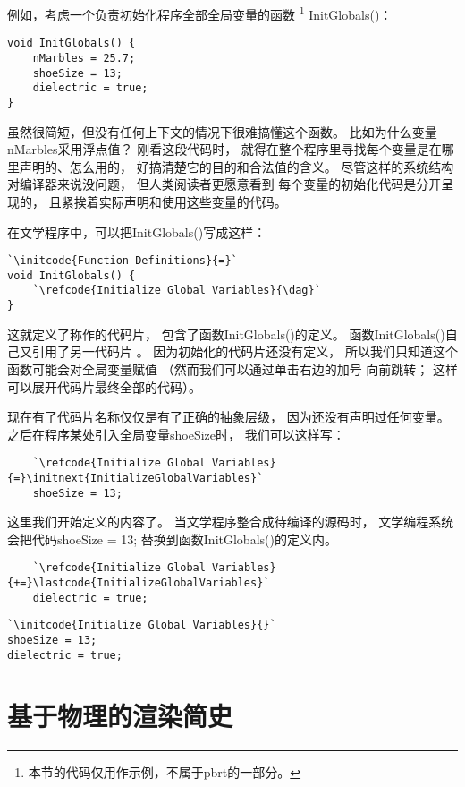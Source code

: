 例如，考虑一个负责初始化程序全部全局变量的函数
\footnote{本节的代码仅用作示例，不属于pbrt的一部分。}
{\ttfamily InitGlobals()}：
\begin{lstlisting}
void InitGlobals() {
    nMarbles = 25.7;
    shoeSize = 13;
    dielectric = true;
}
\end{lstlisting}

虽然很简短，但没有任何上下文的情况下很难搞懂这个函数。
比如为什么变量{\ttfamily nMarbles}采用浮点值？
刚看这段代码时，
就得在整个程序里寻找每个变量是在哪里声明的、怎么用的，
好搞清楚它的目的和合法值的含义。
尽管这样的系统结构对编译器来说没问题，
但人类阅读者更愿意看到
每个变量的初始化代码是分开呈现的，
且紧挨着实际声明和使用这些变量的代码。

在文学程序中，可以把{\ttfamily InitGlobals()}写成这样：
\begin{lstlisting}
`\initcode{Function Definitions}{=}`
void InitGlobals() {
    `\refcode{Initialize Global Variables}{\dag}`
}
\end{lstlisting}

这就定义了称作的代码片，
包含了函数{\ttfamily InitGlobals()}的定义。
函数{\ttfamily InitGlobals()}自己又引用了另一代码片
。
因为初始化的代码片还没有定义，
所以我们只知道这个函数可能会对全局变量赋值
（然而我们可以通过单击右边的加号
向前跳转；
这样可以展开代码片最终全部的代码）。

现在有了代码片名称仅仅是有了正确的抽象层级，
因为还没有声明过任何变量。
之后在程序某处引入全局变量{\ttfamily shoeSize}时，
我们可以这样写：
\begin{lstlisting}
    `\refcode{Initialize Global Variables}{=}\initnext{InitializeGlobalVariables}`
    shoeSize = 13;
\end{lstlisting}

这里我们开始定义的内容了。
当文学程序整合成待编译的源码时，
文学编程系统会把代码{\ttfamily shoeSize = 13;}
替换到函数{\ttfamily InitGlobals()}的定义内。

\begin{lstlisting}
    `\refcode{Initialize Global Variables}{+=}\lastcode{InitializeGlobalVariables}`
    dielectric = true;
\end{lstlisting}

\begin{lstlisting}
`\initcode{Initialize Global Variables}{}`
shoeSize = 13;
dielectric = true;
\end{lstlisting}
\section{基于物理的渲染简史}\label{sec:基于物理的渲染简史}

